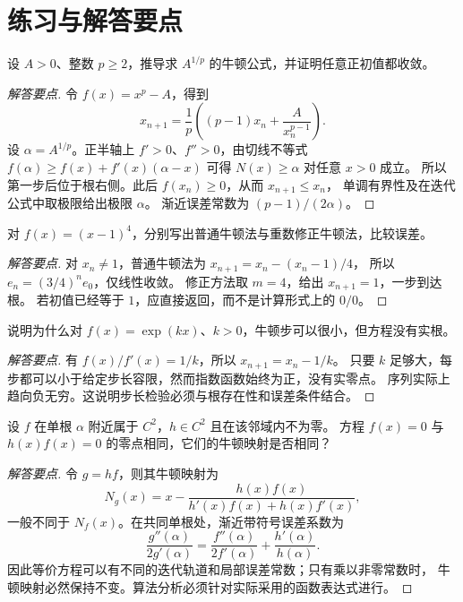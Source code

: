 \documentclass{ctexart}
\begin{document}
\section{练习与解答要点}
\label{sec:newton-exercises}

\begin{example}[正数的高次方根]
设 $A>0$、整数 $p\ge2$，推导求 $A^{1/p}$ 的牛顿公式，并证明任意正初值都收敛。
\end{example}
\begin{proof}[解答要点]
令 $f(x)=x^p-A$，得到
\[
  x_{n+1}=\frac1p\left((p-1)x_n+\frac{A}{x_n^{p-1}}\right).
\]
设 $\alpha=A^{1/p}$。正半轴上 $f'>0$、$f''>0$，由切线不等式
$f(\alpha)\ge f(x)+f'(x)(\alpha-x)$ 可得 $N(x)\ge\alpha$ 对任意 $x>0$ 成立。
所以第一步后位于根右侧。此后 $f(x_n)\ge0$，从而 $x_{n+1}\le x_n$，
单调有界性及在迭代公式中取极限给出极限 $\alpha$。
渐近误差常数为 $(p-1)/(2\alpha)$。
\end{proof}

\begin{example}[判断重根对精度的影响]
对 $f(x)=(x-1)^4$，分别写出普通牛顿法与重数修正牛顿法，比较误差。
\end{example}
\begin{proof}[解答要点]
对 $x_n\ne1$，普通牛顿法为 $x_{n+1}=x_n-(x_n-1)/4$，
所以 $e_n=(3/4)^ne_0$，仅线性收敛。
修正方法取 $m=4$，给出 $x_{n+1}=1$，一步到达根。
若初值已经等于 $1$，应直接返回，而不是计算形式上的 $0/0$。
\end{proof}

\begin{example}[小步长不能独立认证精度]
说明为什么对 $f(x)=\exp(kx)$、$k>0$，牛顿步可以很小，但方程没有实根。
\end{example}
\begin{proof}[解答要点]
有 $f(x)/f'(x)=1/k$，所以 $x_{n+1}=x_n-1/k$。
只要 $k$ 足够大，每步都可以小于给定步长容限，然而指数函数始终为正，没有实零点。
序列实际上趋向负无穷。这说明步长检验必须与根存在性和误差条件结合。
\end{proof}

\begin{example}[方程表示会改变牛顿映射]
设 $f$ 在单根 $\alpha$ 附近属于 $C^2$，$h\in C^2$ 且在该邻域内不为零。
方程 $f(x)=0$ 与 $h(x)f(x)=0$ 的零点相同，它们的牛顿映射是否相同？
\end{example}
\begin{proof}[解答要点]
令 $g=hf$，则其牛顿映射为
\[
  N_g(x)=x-\frac{h(x)f(x)}{h'(x)f(x)+h(x)f'(x)},
\]
一般不同于 $N_f(x)$。在共同单根处，渐近带符号误差系数为
\[
  \frac{g''(\alpha)}{2g'(\alpha)}
  =\frac{f''(\alpha)}{2f'(\alpha)}+\frac{h'(\alpha)}{h(\alpha)}.
\]
因此等价方程可以有不同的迭代轨道和局部误差常数；只有乘以非零常数时，
牛顿映射必然保持不变。算法分析必须针对实际采用的函数表达式进行。
\end{proof}
\end{document}
